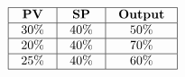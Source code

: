 
$$\vbox{\offinterlineskip
\halign{\strut
\vrule \quad\hfil # \ \hfil & 
\vrule \quad\hfil # \ \hfil & 
\vrule \quad\hfil # \ \hfil \vrule \cr
\noalign{\hrule}
%
{\bf PV} & {\bf SP} & {\bf Output} \cr
%
\noalign{\hrule}
%
30\% & 40\% & 50\% \cr
%
\noalign{\hrule}
%
20\% & 40\% & 70\% \cr
%
\noalign{\hrule}
%
25\% & 40\% & 60\% \cr
%
\noalign{\hrule}
} %
}$$ %





